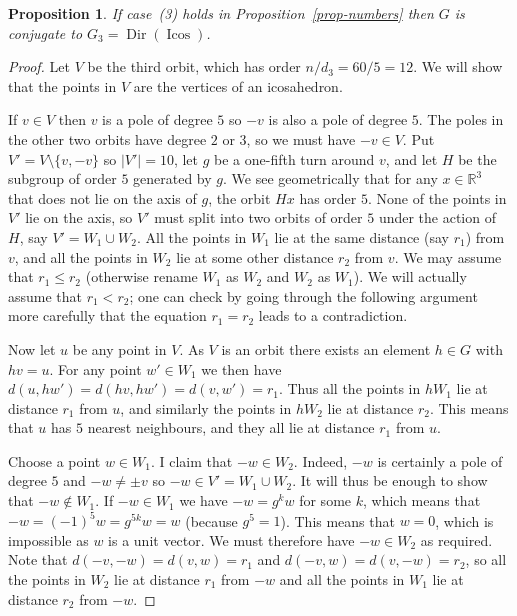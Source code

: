 \documentclass{amsart}
\DeclareMathOperator{\Icos}     {Icos}
\DeclareMathOperator{\Dir}      {Dir}
\newcommand{\R}         {{\mathbb{R}}}
\newcommand{\sm}        {\setminus}
\renewcommand{\:}{\colon}
\newtheorem{proposition}[theorem]{Proposition}
\theoremstyle{definition}
\begin{document}
\begin{proposition}\label{prop-class-icos}
 If case~(3) holds in Proposition~\ref{prop-numbers} then $G$ is
 conjugate to $G_3=\Dir(\Icos)$.
\end{proposition}
\begin{proof}
 Let $V$ be the third orbit, which has order $n/d_3=60/5=12$.  We will
 show that the points in $V$ are the vertices of an icosahedron.
 
 If $v\in V$ then $v$ is a pole of degree $5$ so $-v$ is also a pole
 of degree $5$.  The poles in the other two orbits have degree $2$ or
 $3$, so we must have $-v\in V$.  Put $V'=V\sm\{v,-v\}$ so $|V'|=10$,
 let $g$ be a one-fifth turn around $v$, and let $H$ be the subgroup
 of order $5$ generated by $g$.  We see geometrically that for any
 $x\in\R^3$ that does not lie on the axis of $g$, the orbit $Hx$ has
 order $5$.  None of the points in $V'$ lie on the axis, so $V'$ must
 split into two orbits of order $5$ under the action of $H$, say
 $V'=W_1\cup W_2$.  All the points in $W_1$ lie at the same distance
 (say $r_1$) from $v$, and all the points in $W_2$ lie at some other
 distance $r_2$ from $v$.  We may assume that $r_1\leq r_2$ (otherwise
 rename $W_1$ as $W_2$ and $W_2$ as $W_1$).  We will actually assume
 that $r_1<r_2$; one can check by going through the following argument
 more carefully that the equation $r_1=r_2$ leads to a contradiction.

 Now let $u$ be any point in $V$.  As $V$ is an orbit there exists an
 element $h\in G$ with $hv=u$.  For any point $w'\in W_1$ we then have
 $d(u,hw')=d(hv,hw')=d(v,w')=r_1$.  Thus all the points in $hW_1$ lie
 at distance $r_1$ from $u$, and similarly the points in $hW_2$ lie at
 distance $r_2$.  This means that $u$ has $5$ nearest neighbours, and
 they all lie at distance $r_1$ from $u$.

 Choose a point $w\in W_1$.  I claim that $-w\in W_2$.  Indeed, $-w$
 is certainly a pole of degree $5$ and $-w\neq\pm v$ so
 $-w\in V'=W_1\cup W_2$.  It will thus be enough to show that
 $-w\not\in W_1$.  If $-w\in W_1$ we have $-w=g^kw$ for some $k$,
 which means that $-w=(-1)^5w=g^{5k}w=w$ (because $g^5=1$).  This
 means that $w=0$, which is impossible as $w$ is a unit vector.  We
 must therefore have $-w\in W_2$ as required.  Note that
 $d(-v,-w)=d(v,w)=r_1$ and $d(-v,w)=d(v,-w)=r_2$, so all the points in
 $W_2$ lie at distance $r_1$ from $-w$ and all the points in $W_1$ lie
 at distance $r_2$ from $-w$.


\end{proof}
\end{document}
